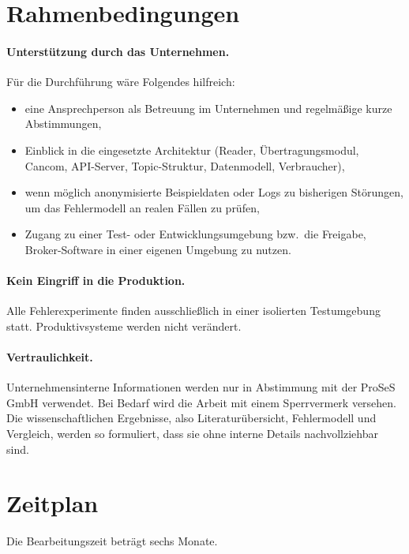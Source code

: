 \documentclass[11pt, a4paper]{article}
\begin{document}
\section{Rahmenbedingungen}

\paragraph{Unterstützung durch das Unternehmen.} Für die Durchführung wäre Folgendes hilfreich:
\begin{itemize}[nosep]
    \item eine Ansprechperson als Betreuung im Unternehmen und regelmäßige kurze Abstimmungen,
    \item Einblick in die eingesetzte Architektur (Reader, Übertragungsmodul, Cancom, API-Server, Topic-Struktur, Datenmodell, Verbraucher),
    \item wenn möglich anonymisierte Beispieldaten oder Logs zu bisherigen Störungen, um das Fehlermodell an realen Fällen zu prüfen,
    \item Zugang zu einer Test- oder Entwicklungsumgebung bzw.\ die Freigabe, Broker-Software in einer eigenen Umgebung zu nutzen.
\end{itemize}

\paragraph{Kein Eingriff in die Produktion.} Alle Fehlerexperimente finden ausschließlich in einer isolierten Testumgebung statt. Produktivsysteme werden nicht verändert.

\paragraph{Vertraulichkeit.} Unternehmensinterne Informationen werden nur in Abstimmung mit der ProSeS GmbH verwendet. Bei Bedarf wird die Arbeit mit einem Sperrvermerk versehen. Die wissenschaftlichen Ergebnisse, also Literaturübersicht, Fehlermodell und Vergleich, werden so formuliert, dass sie ohne interne Details nachvollziehbar sind. 

\section{Zeitplan}

Die Bearbeitungszeit beträgt sechs Monate.
\end{document}
